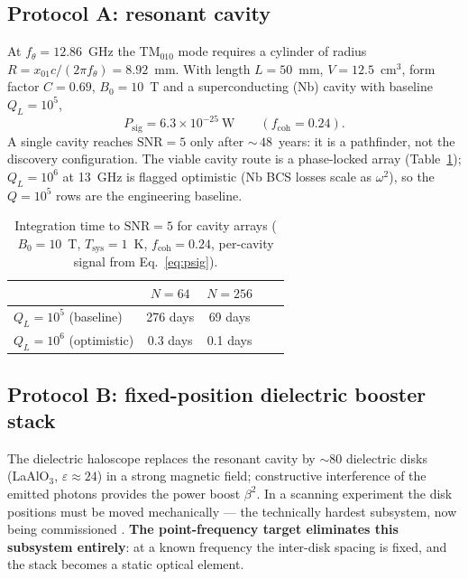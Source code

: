 \documentclass[11pt,a4paper]{article}
\begin{document}
\subsection{Protocol A: resonant cavity}
\label{sec:cavity}

At $f_\theta = 12.86$~GHz the TM$_{010}$ mode requires a cylinder of radius
$R = x_{01} c/(2\pi f_\theta) = 8.92$~mm. With length $L = 50$~mm,
$V = 12.5$~cm$^3$, form factor $C = 0.69$, $B_0 = 10$~T and a superconducting
(Nb) cavity with baseline $Q_L = 10^{5}$,
\begin{equation}
P_{\mathrm{sig}} = 6.3\times 10^{-25}~\text{W}
\qquad (f_{\mathrm{coh}} = 0.24).
\end{equation}
A single cavity reaches $\text{SNR} = 5$ only after ${\sim}\,48$~years: it is a
pathfinder, not the discovery configuration. The viable cavity route is a
phase-locked array (Table~\ref{tab:arrays}); $Q_L = 10^6$ at 13~GHz is flagged
optimistic (Nb BCS losses scale as $\omega^2$), so the $Q = 10^5$ rows are the
engineering baseline.

\begin{table}[h]
\centering
\caption{Integration time to $\text{SNR}=5$ for cavity arrays
($B_0 = 10$~T, $T_{\mathrm{sys}} = 1$~K, $f_{\mathrm{coh}} = 0.24$,
per-cavity signal from Eq.~\eqref{eq:psig}).}
\label{tab:arrays}
\begin{tabular}{lcccc}
\toprule
& $N = 64$ & $N = 256$ \\
\midrule
$Q_L = 10^{5}$ (baseline) & 276 days & 69 days \\
$Q_L = 10^{6}$ (optimistic) & 0.3 days & 0.1 days \\
\bottomrule
\end{tabular}
\end{table}

\subsection{Protocol B: fixed-position dielectric booster stack}
\label{sec:stack}

The dielectric haloscope \cite{MADMAX2017} replaces the resonant cavity by
${\sim}80$ dielectric disks (LaAlO$_3$, $\varepsilon \approx 24$) in a strong
magnetic field; constructive interference of the emitted photons provides the
power boost $\beta^2$. In a scanning experiment the disk positions must be
moved mechanically --- the technically hardest subsystem, now being
commissioned \cite{MADMAXmech}. \textbf{The point-frequency target eliminates
this subsystem entirely}: at a known frequency the inter-disk spacing is
fixed, and the stack becomes a static optical element.
\end{document}
